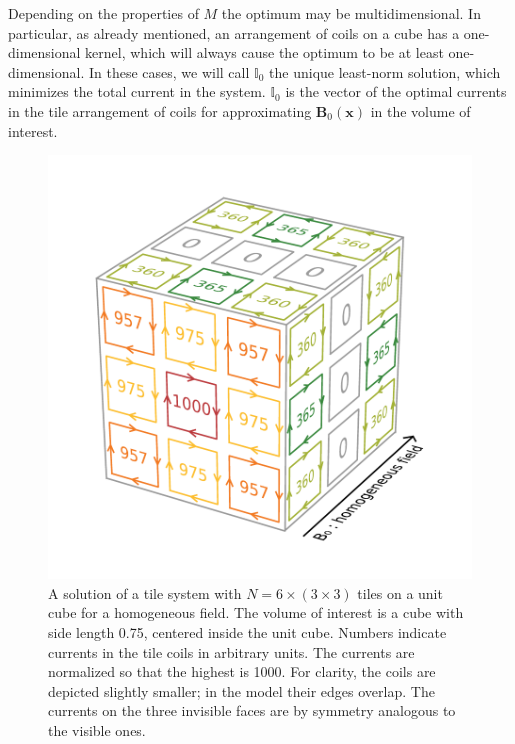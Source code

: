 Depending on the properties of $M$ the optimum may be multidimensional. In particular, as already mentioned, an arrangement of coils on a cube has a one-dimensional kernel, which will always cause the optimum to be at least one-dimensional. In these cases, we will call $\mathbb{I}_0$ the unique least-norm solution, which minimizes the total current in the system. $\mathbb{I}_0$ is the vector of the optimal currents in the tile arrangement of coils for approximating $\mathbf{B}_0(\mathbf{x})$ in the volume of interest.

\begin{figure}
  \centering
  \includegraphics[width=\linewidth]{gfx/coils/homogeneous_tiles_norm_1000.pdf}
  \caption{A solution of a tile system with $N = 6 \times (3 \times 3)$ tiles on a unit cube for a homogeneous field. The volume of interest is a cube with side length \num{0.75}, centered inside the unit cube. Numbers indicate currents in the tile coils in arbitrary units. The currents are normalized so that the highest is \num{1000}. For clarity, the coils are depicted slightly smaller; in the model their edges overlap. The currents on the three invisible faces are by symmetry analogous to the visible ones.}\label{fig:homogeneous_tiles}
\end{figure}

